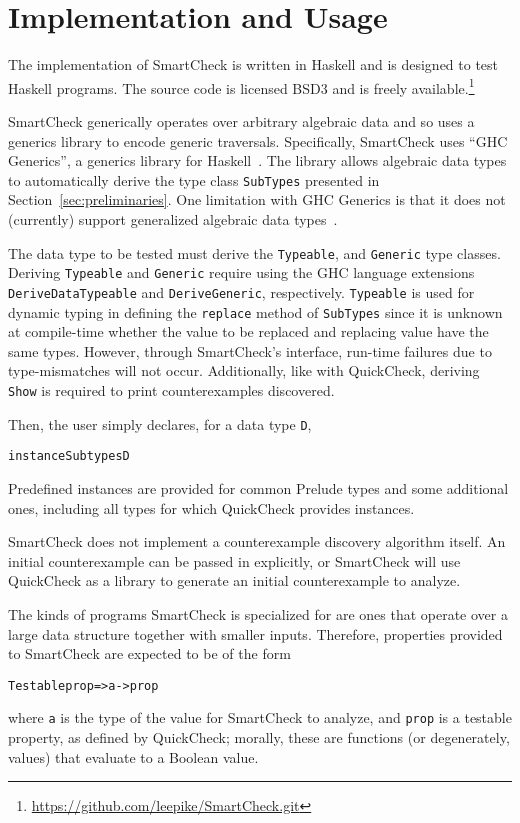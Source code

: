 \documentclass{sigplanconf}
\newenvironment{code}{\begin{alltt}\footnotesize}{\end{alltt}}
\newcommand{\ttp}[1]{\texttt{#1}}
\begin{document}
\section{Implementation and Usage}\label{sec:implementation}

The implementation of SmartCheck is written in Haskell and is designed to test
Haskell programs.  The source code is licensed BSD3 and is freely
available.\footnote{\url{https://github.com/leepike/SmartCheck.git}}

SmartCheck generically operates over arbitrary algebraic data and so uses a
generics library to encode generic traversals.  Specifically, SmartCheck uses
``GHC Generics'', a generics library for Haskell~\cite{generics}.  The library
allows algebraic data types to automatically derive the type class
\ttp{SubTypes} presented in Section~\ref{sec:preliminaries}.  One limitation
with GHC Generics is that it does not (currently) support generalized algebraic
data types~\cite{gadts}.

The data type to be tested must derive the \ttp{Typeable}, and \ttp{Generic}
type classes.  Deriving \ttp{Typeable} and \ttp{Generic} require using the GHC
language extensions \ttp{DeriveDataTypeable} and \ttp{DeriveGeneric},
respectively.  \ttp{Typeable} is used for dynamic typing in defining the
\ttp{replace} method of \ttp{SubTypes} since it is unknown at compile-time
whether the value to be replaced and replacing value have the same types.
However, through SmartCheck's interface, run-time failures due to
type-mismatches will not occur.  Additionally, like with QuickCheck, deriving
\ttp{Show} is required to print counterexamples discovered.

Then, the user simply declares, for a data type \ttp{D},
%
\begin{code}
instance Subtypes D
\end{code}
%
Predefined instances are provided for common Prelude types and some additional
ones, including all types for which QuickCheck provides instances.

SmartCheck does not implement a counterexample discovery algorithm itself.  An
initial counterexample can be passed in explicitly, or SmartCheck will use
QuickCheck as a library to generate an initial counterexample to analyze.

The kinds of programs SmartCheck is specialized for are ones that operate over a
large data structure together with smaller inputs.  Therefore, properties
provided to SmartCheck are expected to be of the form
%
\begin{code}
Testable prop => a -> prop
\end{code}
%
where \ttp{a} is the type of the value for SmartCheck to analyze, and \ttp{prop}
is a testable property, as defined by QuickCheck; morally, these are functions
(or degenerately, values) that evaluate to a Boolean value.
\end{document}
